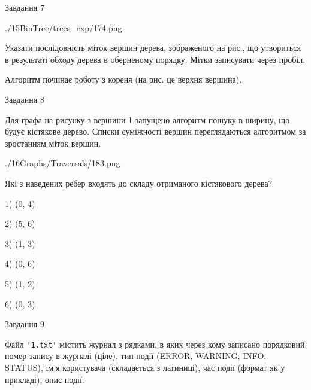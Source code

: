 \documentclass[12pt, ukrainian]{article}
\def\code#1{\Verb!#1!}
\begin{document}
{\vspace{10mm}\par

\newpage
\begin{minipage}[t]{9.7cm}
               
{\begin{center}Завдання {7}\end{center}}
\vspace{-6mm}

\begin{center}
	{./15BinTree/trees_exp/174.png}
\end{center}
Указати послідовність міток вершин дерева, зображеного на рис., що утвориться в результаті обходу дерева в оберненому порядку. Мітки записувати через пробіл.\par Алгоритм починає роботу з кореня (на рис. це верхня вершина).\par

\end{minipage}
\vline \hspace{8mm}
\begin{minipage}[t]{8.0cm}
               
{\begin{center}Завдання {8}\end{center}}
\vspace{-6mm}
Для графа на рисунку з вершини 1 запущено алгоритм пошуку в ширину, що будує кістякове дерево. Списки суміжності вершин переглядаються алгоритмом за зростанням міток вершин.\par
\begin{center}
	{./16Graphs/Traversals/183.png}
\end{center}
\par Які з наведених ребер входять до складу отриманого кістякового дерева?\par
1) (0, 4)\par
2) (5, 6)\par
3) (1, 3)\par
4) (0, 6)\par
5) (1, 2)\par
6) (0, 3)\par
{\vskip 15pt} \par

\end{minipage}

               
{\begin{center}Завдання {9}\end{center}}
\vspace{-6mm}
Файл \code{'1.txt'} містить журнал з рядками, в яких через кому записано поряд\-ко\-вий номер запису в журналі (ціле), тип події (ERROR, WARNING, INFO, STATUS), ім'я користувача (складається з латиниці), час події (фор\-мат як у прикладі), опис події.

}
\end{document}
